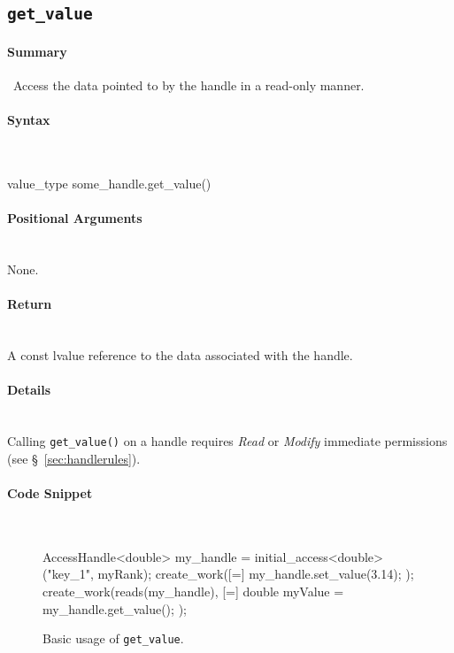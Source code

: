 \subsection{\texttt{get\_value}}

\paragraph{Summary} \mbox{}\
Access the data pointed to by the handle in a read-only manner.

\paragraph{Syntax}\mbox{}\\
\begin{CppCode}
value_type some_handle.get_value()
\end{CppCode}

\paragraph{Positional Arguments}\mbox{}\\ 
None.

\paragraph{Return}\mbox{}\\ 
A const lvalue reference to the data associated with the handle.  

\paragraph{Details}\mbox{}\\ 
Calling \texttt{get\_value()} on a handle requires {\it Read} or {\it
Modify} immediate permissions (see \S~\ref{sec:handlerules}).


\paragraph{Code Snippet}\mbox{}\\ 
\begin{figure}[!h]
\begin{CppCodeNumb}
AccessHandle<double> my_handle = initial_access<double>("key_1", myRank);
create_work([=]{
  my_handle.set_value(3.14);
});
create_work(reads(my_handle), [=]{
  double myValue = my_handle.get_value();
});
\end{CppCodeNumb}
\label{fig:fe_api_get_value}
\caption{Basic usage of \texttt{get\_value}.}
\end{figure}




